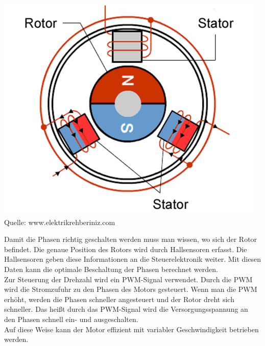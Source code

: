 \documentclass[ngerman,12pt,a4paper]{article}
\begin{document}
			\begin{center}
				\begin{minipage}{\textwidth}
					\centering
					\includegraphics[scale=0.3]{Pictures/BLDC_Motor}
					\label{fig:spiffs_init}
					\vspace{-2pt}
					\small Quelle: www.elektrikrehberiniz.com
				\end{minipage}
			\end{center}
			Damit die Phasen richtig geschalten werden muss man wissen, wo sich der Rotor befindet. Die genaue Position des Rotors wird durch Hallsensoren erfasst. Die Hallsensoren geben diese Informationen an die Steuerelektronik weiter. Mit diesen Daten kann die optimale Beschaltung der Phasen berechnet werden.\\[0.5cm]
			Zur Steuerung der Drehzahl wird ein PWM-Signal verwendet. Durch die PWM wird die Stromzufuhr zu den Phasen des Motors gesteuert. Wenn man die PWM erhöht, werden die Phasen schneller angesteuert und der Rotor dreht sich schneller. Das heißt durch das PWM-Signal wird die Versorgungsspannung an den Phasen schnell ein- und ausgeschalten.\\[0.5cm]
			Auf diese Weise kann der Motor effizient mit variabler Geschwindigkeit betrieben werden.
			
\end{document}

